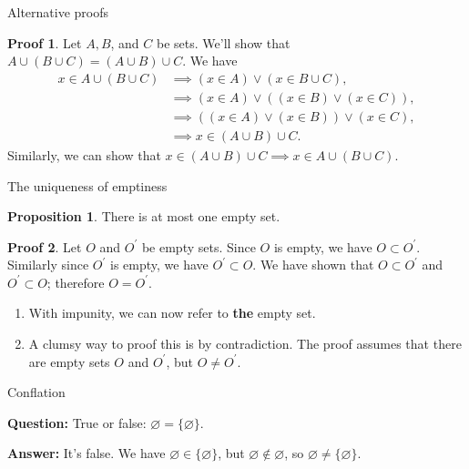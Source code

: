 \documentclass[fleqn]{beamer}
\theoremstyle{definition}
\newtheorem{myth}{Proposition}
\newtheorem{myproof}{Proof}
\begin{document}
\begin{frame}{Alternative proofs}


\begin{myproof}  Let \(A,B\), and \(C\) be sets.  We'll show that \(A \cup (B \cup C) =  (A \cup B) \cup C\).
We have
\begin{align*}
  x \in A \cup (B \cup C)  &\implies (x \in A) \lor (x \in B \cup C), \\
                                            &\implies  (x \in A) \lor ( (x \in  B) \lor (x \in C)), \\
                                           &  \implies  (  (x \in A) \lor  (x \in  B) ) \lor (x \in C), \\
                                           & \implies x \in  ( A \cup B)  \cup C.
\end{align*}
Similarly, we can show that \(   x \in (A \cup B) \cup C \implies x \in A \cup (B \cup C)\).
\end{myproof}

\end{frame}
\begin{frame}{The uniqueness of emptiness}

\begin{myth} There is at most one empty set. \end{myth}

\begin{myproof} Let \(O\) and \(O^\prime\) be empty sets.  Since  \(O\) is empty, we have \(O \subset O^\prime\). Similarly since   \(O^\prime \) is empty, we have \(O^\prime  \subset O\). We have shown that \(O \subset O^\prime\) and \(O^\prime  \subset O\); therefore \(O = O^\prime\). \end{myproof}

\begin{enumerate}

\item With impunity, we can now refer to  \textbf{the} empty set.

\item A clumsy  way to proof this is by contradiction. The proof assumes that there are empty sets \(O\) and \(O^\prime\), but \(O \neq O^\prime\).

\end{enumerate}
\end{frame}

\begin{frame}{Conflation}

\textbf{Question:}  True or false:  \(\varnothing = \{\varnothing \}\).


\vspace{0.2in}

\textbf{Answer:} It's false. We have \(\varnothing \in \{\varnothing \} \),
but \(\varnothing \not \in \varnothing\), so \(\varnothing \neq \{\varnothing \} \).




\end{frame}
\end{document}
